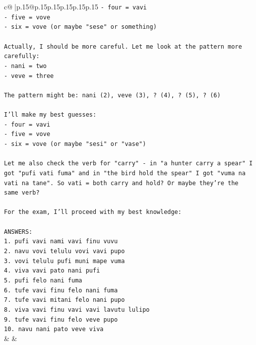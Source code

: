 \documentclass{article}
\begin{document}
{\begin{supertabular}{c@{$\;$}|p{.15\linewidth}@{}p{.15\linewidth}p{.15\linewidth}p{.15\linewidth}p{.15\linewidth}p{.15\linewidth}}
{{{\texttt{{-} four = vavi} \\
\texttt{{-} five = vove} \\
\texttt{{-} six = vove (or maybe "sese" or something)} \\
\\ 
\texttt{Actually, I should be more careful. Let me look at the pattern more carefully:} \\
\texttt{{-} nani = two} \\
\texttt{{-} veve = three} \\
\\ 
\texttt{The pattern might be: nani (2), veve (3), ? (4), ? (5), ? (6)} \\
\\ 
\texttt{I'll make my best guesses:} \\
\texttt{{-} four = vavi} \\
\texttt{{-} five = vove} \\
\texttt{{-} six = vove (or maybe "sesi" or "vase")} \\
\\ 
\texttt{Let me also check the verb for "carry" {-} in "a hunter carry a spear" I got "pufi vati fuma" and in "the bird hold the spear" I got "vuma na vati na tane". So vati = both carry and hold? Or maybe they're the same verb?} \\
\\ 
\texttt{For the exam, I'll proceed with my best knowledge:} \\
\\ 
\texttt{ANSWERS:} \\
\texttt{1. pufi vavi nami vavi finu vuvu} \\
\texttt{2. navu vovi telulu vovi vavi pupo} \\
\texttt{3. vovi telulu pufi muni mape vuma} \\
\texttt{4. viva vavi pato nani pufi} \\
\texttt{5. pufi felo nani fuma} \\
\texttt{6. tufe vavi finu felo nani fuma} \\
\texttt{7. tufe vavi mitani felo nani pupo} \\
\texttt{8. viva vavi finu vavi vavi lavutu lulipo} \\
\texttt{9. tufe vavi finu felo veve pupo} \\
\texttt{10. navu nani pato veve viva} \\
            }
        }
    }
    & & \\ \\


\end{supertabular}}
\end{document}
